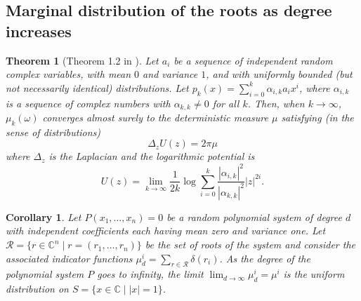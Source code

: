 \documentclass[12pt]{article}
\def\C{\mathbb{C}}
\newtheorem{theorem}{Theorem}[section]
\newtheorem{corollary}{Corollary}[section]
\begin{document}
\subsection{Marginal distribution of the roots as degree increases}


\begin{theorem}[Theorem 1.2 in \cite{barbarino2022limit}]\label{thm:logpot}
    Let $a_i$ be a sequence of independent random complex variables, with mean $0$ and variance $1$, and with uniformly bounded (but not necessarily identical) distributions. Let $p_k(x)=\sum_{i=0}^k \alpha_{i,k} a_i x^i$, where $\alpha_{i,k}$ is a sequence of complex numbers with $\alpha_{k,k} \neq 0$ for all $k$. Then, when $k \longrightarrow \infty$, $\mu_k(\omega)$ converges almost surely to the deterministic measure $\mu$ satisfying (in the sense of distributions)
    \[  \Delta_z U(z) = 2 \pi \mu   \]
    where $\Delta_z$ is the Laplacian and the logarithmic potential is
    \begin{equation}\label{eq:logpot}
        U(z) = \lim_{k \rightarrow \infty} \frac{1}{2k} \log \sum_{i=0}^k \frac{|\alpha_{i,k}|^2}{|\alpha_{k,k}|^2} |z|^{2i}.  
    \end{equation}  
\end{theorem}







\begin{corollary}
    Let $P(x_1,\dots,x_n) = 0$ be a random polynomial system of degree $d$ with independent coefficients each having mean zero and variance one. Let $\mathcal{R} = \{r \in \C^n \mid r = (r_1,\dots,r_n) \}$ be the set of roots of the system and consider the associated indicator functions $\mu_d^i = \sum_{r \in \mathcal{R}} \delta(r_i)$.
    As the degree of the polynomial system $P$ goes to infinity, the limit $\lim_{d\to \infty} \mu_d^i = \mu^i$ is the uniform distribution on $S = \{ x \in \C \mid |x| = 1 \}$.
\end{corollary}
\end{document}
